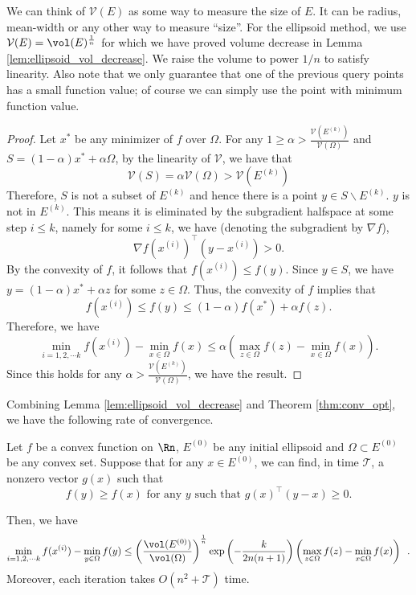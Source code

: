 \begin{rem}
We can think of $\mathcal{V}(E)$ as some way to measure the size
of $E$. It can be radius, mean-width or any other way to measure
``size''. For the ellipsoid method, we use $\mathcal{V}(E)=\vol(E)^{\frac{1}{n}}$
for which we have proved volume decrease in Lemma \ref{lem:ellipsoid_vol_decrease}.
We raise the volume to power $1/n$ to satisfy linearity. Also note
that we only guarantee that one of the previous query points has a
small function value; of course we can simply use the point with minimum
function value.
\end{rem}

\begin{proof}
Let $x^{*}$ be any minimizer of $f$ over $\Omega$. For any $1\ge\alpha>\frac{\mathcal{V}(E^{(k)})}{\mathcal{V}(\Omega)}$
and $S=(1-\alpha)x^{*}+\alpha\Omega$, by the linearity of $\mathcal{V}$,
we have that 
\[
\mathcal{V}(S)=\alpha\mathcal{V}(\Omega)>\mathcal{V}(E^{(k)})
\]
Therefore, $S$ is not a subset of $E^{(k)}$ and hence there is a
point $y\in S\backslash E^{(k)}$. $y$ is not in $E^{(k)}$. This
means it is eliminated by the subgradient halfspace at some step $i\leq k$,
namely for some $i\le k$, we have (denoting the subgradient by $\nabla f$),
\[
\nabla f(x^{(i)})^{\top}(y-x^{(i)})>0.
\]
By the convexity of $f$, it follows that $f(x^{(i)})\leq f(y).$
Since $y\in S$, we have $y=(1-\alpha)x^{*}+\alpha z$ for some $z\in\Omega$.
Thus, the convexity of $f$ implies that
\[
f(x^{(i)})\leq f(y)\leq(1-\alpha)f(x^{*})+\alpha f(z).
\]
Therefore, we have
\[
\min_{i=1,2,\cdots k}f(x^{(i)})-\min_{x\in\Omega}f(x)\leq\alpha\left(\max_{z\in\Omega}f(z)-\min_{x\in\Omega}f(x)\right).
\]
Since this holds for any $\alpha>\frac{\mathcal{V}(E^{(k)})}{\mathcal{V}(\Omega)}$,
we have the result.
\end{proof}
Combining Lemma \ref{lem:ellipsoid_vol_decrease} and Theorem \ref{thm:conv_opt},
we have the following rate of convergence.
\begin{thm}
\label{thm:ellipsoid}Let $f$ be a convex function on $\Rn$, $E^{(0)}$
be any initial ellipsoid and $\Omega\subset E^{(0)}$ be any convex
set. Suppose that for any $x\in E^{(0)}$, we can find, in time $\mathcal{T}$,
a nonzero vector $g(x)$ such that 
\[
f(y)\geq f(x)\text{ for any }y\text{ such that }g(x)^{\top}(y-x)\geq0.
\]

Then, we have
\[
\min_{i=1,2,\cdots k}f(x^{(i)})-\min_{y\in\Omega}f(y)\leq\left(\frac{\vol(E^{(0)})}{\vol(\Omega)}\right)^{\frac{1}{n}}\exp\left(-\frac{k}{2n(n+1)}\right)\left(\max_{z\in\Omega}f(z)-\min_{x\in\Omega}f(x)\right)\enspace.
\]
Moreover, each iteration takes $O(n^{2}+\mathcal{T})$ time.
\end{thm}

